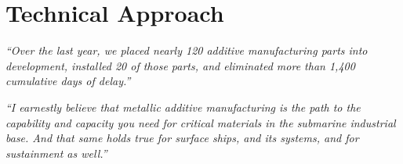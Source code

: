 \documentclass[12pt,letterpaper]{article}
\begin{document}
\setcounter{page}{2}
\setcounter{tocdepth}{2}
\tableofcontents
\clearpage


\section{Technical Approach}

\begin{flushleft}
\hspace*{0.5in}\begin{minipage}{4.9in}
\itshape ``Over the last year, we placed nearly 120 additive manufacturing
parts into development, installed 20 of those parts, and eliminated more than
1,400 cumulative days of delay.''\par
{}
\end{minipage}

\vspace{6pt}
\hspace*{0.5in}\begin{minipage}{4.9in}
\itshape ``I earnestly believe that metallic additive manufacturing is the
path to the capability and capacity you need for critical materials in the
submarine industrial base. And that same holds true for surface ships, and
its systems, and for sustainment as well.''\par
{}
\end{minipage}
\end{flushleft}
\end{document}
